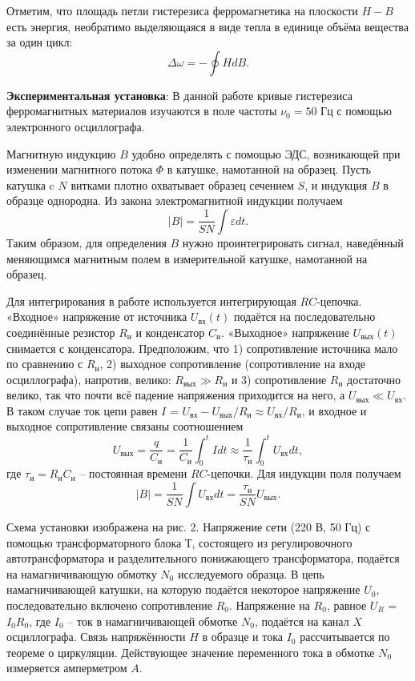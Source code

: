 \documentclass[a4paper,12pt]{article}
\begin{document}
Отметим, что площадь петли гистерезиса ферромагнетика на плоскости $H-B$ есть энергия, необратимо выделяющаяся в виде тепла в единице объёма вещества за один цикл:
\[\Delta \omega = - \oint H dB.\]


\textbf{Экспериментальная установка}:
В данной работе кривые гистерезиса ферромагнитных материалов изучаются в поле частоты $\nu_0 = 50$ Гц с помощью электронного осциллографа.

Магнитную индукцию $B$ удобно определять с помощью ЭДС, возникающей при изменении магнитного потока $\Phi$ в катушке, намотанной на образец. Пусть катушка c $N$ витками плотно охватывает образец сечением $S$, и индукция $B$ в образце
однородна. Из закона электромагнитной индукции получаем
\[|B| = \frac{1}{S N} \int \varepsilon dt.\]
Таким образом, для определения $B$ нужно проинтегрировать сигнал, наведённый меняющимся магнитным полем в измерительной катушке, намотанной на образец.

Для интегрирования в работе используется интегрирующая $RC$-цепочка. «Входное» напряжение от источника $U_{вх}(t)$ подаётся на последовательно соединённые резистор $R_{и}$ и конденсатор $C_{и}$. «Выходное» напряжение $U_{вых}(t)$ снимается с конденсатора. Предположим, что 1) сопротивление источника мало по сравнению с $R_{и}$, 2) выходное сопротивление (сопротивление на входе осциллографа), напротив, велико: $R_{вых} \gg R_{и}$ и 3) сопротивление $R_{и}$ достаточно велико, так что почти всё падение напряжения приходится на него, а $U_{вых} \ll U_{вх}$. В таком случае ток цепи равен $I$ = $U_{вх} - U_{вых} / R_{и} \approx U_{вх} / R_{и}$, и входное и выходное сопротивление связаны соотношением
\[U_{вых} = \frac{q}{C_и} = \frac{1}{C_и} \int_0^t I dt \approx \frac{1}{\tau_и} \int_0^t U_{вх} dt,\]
где $\tau_и = R_и C_и$ -- постоянная времени $RC$-цепочки. Для индукции поля получаем
\[|B| = \frac{1}{S N} \int U_{вх} dt = \frac{\tau_и}{S N} U_{вых}.\]

Схема установки изображена на рис. 2. Напряжение сети (220 В, 50 Гц) с помощью трансформаторного блока Т, состоящего из регулировочного автотрансформатора и разделительного понижающего трансформатора, подаётся на намагничивающую обмотку $N_0$ исследуемого образца. В цепь намагничивающей катушки, на которую подаётся некоторое напряжение $U_0$, последовательно включено сопротивление $R_0$. Напряжение на $R_0$, равное $U_R$ = $I_0 R_0$, где $I_0$ -- ток в намагничивающей обмотке $N_0$, подаётся на канал $X$ осциллографа. Связь напряжённости $H$ в
образце и тока $I_0$ рассчитывается по теореме о циркуляции. Действующее значение переменного тока в обмотке $N_0$ измеряется амперметром $A$.
\end{document}
